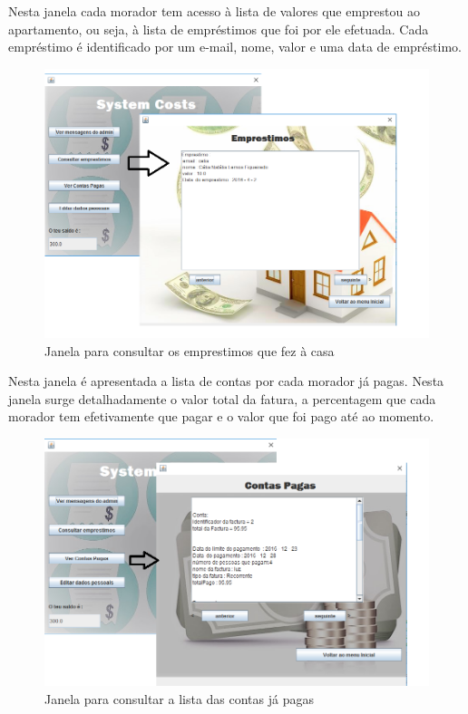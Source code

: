 \newpage

Nesta janela cada morador tem acesso à lista de valores que emprestou ao apartamento, ou seja, à lista de empréstimos que foi por ele efetuada. Cada empréstimo é identificado por um e-mail, nome, valor e uma data de empréstimo. 

\begin{figure}[h!]
	\centering
	\includegraphics[scale=0.5]{imagens/interface/consultaremprestimos}  
	\caption{Janela para consultar os emprestimos que fez à casa}  
\end{figure}

Nesta janela é apresentada a lista de contas por cada morador já pagas. Nesta janela surge detalhadamente o valor total da fatura, a percentagem que cada morador tem efetivamente que pagar e o valor que foi pago até ao momento. 

\begin{figure}[h!]
	\centering
	\includegraphics[scale=0.5]{imagens/interface/vercontaspagasmorador}  
	\caption{Janela para consultar a lista das contas já pagas}  
\end{figure}

